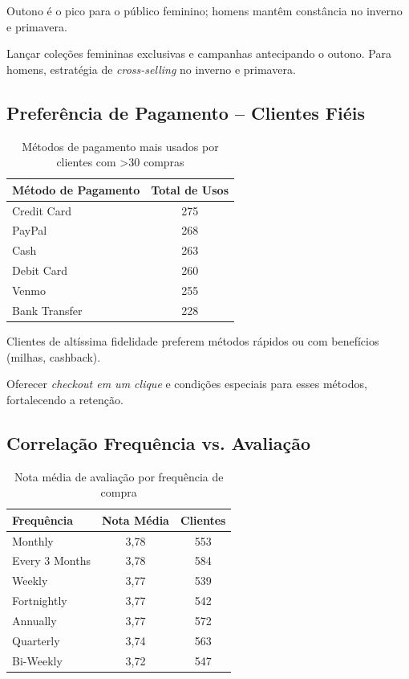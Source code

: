 \documentclass[12pt,a4paper]{article}
\begin{document}
\begin{insightbox}
Outono é o pico para o público feminino; homens mantêm constância no inverno e primavera.
\end{insightbox}
\begin{actionbox}
Lançar coleções femininas exclusivas e campanhas antecipando o outono. Para homens, estratégia de \textit{cross-selling} no inverno e primavera.
\end{actionbox}

\subsection{Preferência de Pagamento – Clientes Fiéis}
\begin{table}[H]
\centering
\caption{Métodos de pagamento mais usados por clientes com >30 compras}
\label{tab:pagamento_fieis}
\begin{tabular}{lc}
\toprule
\rowcolor{lightgray} \textbf{Método de Pagamento} & \textbf{Total de Usos} \\
\midrule
Credit Card   & 275 \\
PayPal        & 268 \\
Cash          & 263 \\
Debit Card    & 260 \\
Venmo         & 255 \\
Bank Transfer & 228 \\
\bottomrule
\end{tabular}
\end{table}

\begin{insightbox}
Clientes de altíssima fidelidade preferem métodos rápidos ou com benefícios (milhas, cashback).
\end{insightbox}
\begin{actionbox}
Oferecer \textit{checkout em um clique} e condições especiais para esses métodos, fortalecendo a retenção.
\end{actionbox}

\subsection{Correlação Frequência vs. Avaliação}
\begin{table}[H]
\centering
\caption{Nota média de avaliação por frequência de compra}
\label{tab:avaliacao_frequencia}
\begin{tabular}{lcc}
\toprule
\rowcolor{lightgray} \textbf{Frequência} & \textbf{Nota Média} & \textbf{Clientes} \\
\midrule
Monthly       & 3,78 & 553 \\
Every 3 Months& 3,78 & 584 \\
Weekly        & 3,77 & 539 \\
Fortnightly   & 3,77 & 542 \\
Annually      & 3,77 & 572 \\
Quarterly     & 3,74 & 563 \\
Bi-Weekly     & 3,72 & 547 \\
\bottomrule
\end{tabular}
\end{table}
\end{document}
